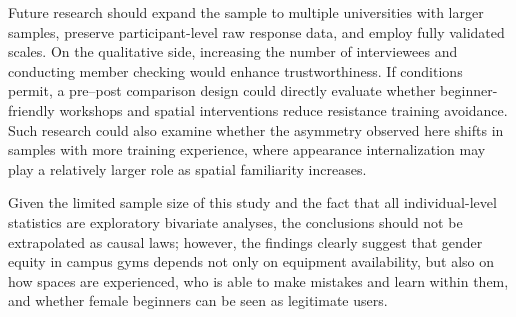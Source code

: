 Future research should expand the sample to multiple universities with larger samples, preserve participant-level raw response data, and employ fully validated scales.
On the qualitative side, increasing the number of interviewees and conducting member checking would enhance trustworthiness.
If conditions permit, a pre--post comparison design could directly evaluate whether beginner-friendly workshops and spatial interventions reduce resistance training avoidance.
Such research could also examine whether the asymmetry observed here shifts in samples with more training experience, where appearance internalization may play a relatively larger role as spatial familiarity increases.

Given the limited sample size of this study and the fact that all individual-level statistics are exploratory bivariate analyses, the conclusions should not be extrapolated as causal laws; however, the findings clearly suggest that gender equity in campus gyms depends not only on equipment availability, but also on how spaces are experienced, who is able to make mistakes and learn within them, and whether female beginners can be seen as legitimate users.
